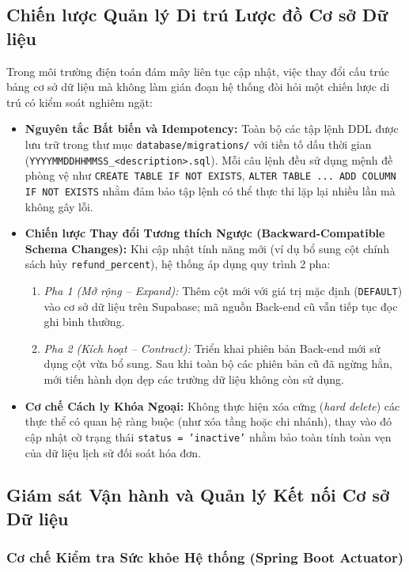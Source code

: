 \subsection{Chiến lược Quản lý Di trú Lược đồ Cơ sở Dữ liệu}

Trong môi trường điện toán đám mây liên tục cập nhật, việc thay đổi cấu trúc bảng cơ sở dữ liệu mà không làm gián đoạn hệ thống đòi hỏi một chiến lược di trú có kiểm soát nghiêm ngặt:

\begin{itemize}
    \item \textbf{Nguyên tắc Bất biến và Idempotency:} Toàn bộ các tập lệnh DDL được lưu trữ trong thư mục \texttt{database/migrations/} với tiền tố dấu thời gian (\texttt{YYYYMMDDHHMMSS\_<description>.sql}). Mỗi câu lệnh đều sử dụng mệnh đề phòng vệ như \texttt{CREATE TABLE IF NOT EXISTS}, \texttt{ALTER TABLE ... ADD COLUMN IF NOT EXISTS} nhằm đảm bảo tập lệnh có thể thực thi lặp lại nhiều lần mà không gây lỗi.
    \item \textbf{Chiến lược Thay đổi Tương thích Ngược (Backward-Compatible Schema Changes):} Khi cập nhật tính năng mới (ví dụ bổ sung cột chính sách hủy \texttt{refund\_percent}), hệ thống áp dụng quy trình 2 pha:
    \begin{enumerate}
        \item \textit{Pha 1 (Mở rộng -- Expand):} Thêm cột mới với giá trị mặc định (\texttt{DEFAULT}) vào cơ sở dữ liệu trên Supabase; mã nguồn Back-end cũ vẫn tiếp tục đọc ghi bình thường.
        \item \textit{Pha 2 (Kích hoạt -- Contract):} Triển khai phiên bản Back-end mới sử dụng cột vừa bổ sung. Sau khi toàn bộ các phiên bản cũ đã ngừng hẳn, mới tiến hành dọn dẹp các trường dữ liệu không còn sử dụng.
    \end{enumerate}
    \item \textbf{Cơ chế Cách ly Khóa Ngoại:} Không thực hiện xóa cứng (\textit{hard delete}) các thực thể có quan hệ ràng buộc (như xóa tầng hoặc chi nhánh), thay vào đó cập nhật cờ trạng thái \texttt{status = 'inactive'} nhằm bảo toàn tính toàn vẹn của dữ liệu lịch sử đối soát hóa đơn.
\end{itemize}

\subsection{Giám sát Vận hành và Quản lý Kết nối Cơ sở Dữ liệu}

\subsubsection{Cơ chế Kiểm tra Sức khỏe Hệ thống (Spring Boot Actuator)}

